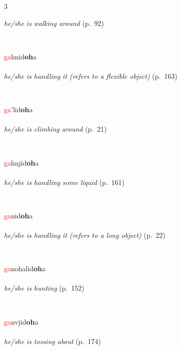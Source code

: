 \documentclass[oneside,openany]{book}%
\begin{document}
\begin{multicols}{3}
\begin{minipage}[t]{\linewidth}
\noindent \textit{he/she is walking around} (p.~92)
\end{minipage}\\[1em]%
\begin{minipage}[t]{\linewidth}
\raggedright\noindent \textcolor{Red}{ga}hnid\textbf{oh}a\\
\\
\noindent \textit{he/she is handling it (refers to a flexible object)} (p.~163)
\end{minipage}\\[1em]%
\begin{minipage}[t]{\linewidth}
\raggedright\noindent \textcolor{Red}{ga}'lid\textbf{oh}a\\
\\
\noindent \textit{he/she is climbing around} (p.~21)
\end{minipage}\\[1em]%
\begin{minipage}[t]{\linewidth}
\raggedright\noindent \textcolor{Red}{ga}hnjid\textbf{oh}a\\
\\
\noindent \textit{he/she is handling some liquid} (p.~161)
\end{minipage}\\[1em]%
\begin{minipage}[t]{\linewidth}
\raggedright\noindent \textcolor{Red}{ga}nid\textbf{oh}a\\
\\
\noindent \textit{he/she is handling it (refers to a long object)} (p.~22)
\end{minipage}\\[1em]%
\begin{minipage}[t]{\linewidth}
\raggedright\noindent \textcolor{Red}{ga}nohalid\textbf{oh}a\\
\\
\noindent \textit{he/she is hunting} (p.~152)
\end{minipage}\\[1em]%
\begin{minipage}[t]{\linewidth}
\raggedright\noindent \textcolor{Red}{ga}nvjid\textbf{oh}a\\
\\
\noindent \textit{he/she is tossing about} (p.~174)
\end{minipage}\\[1em]%
\end{multicols}%
\vspace{1em}%
\needspace{3in}%
\end{document}
